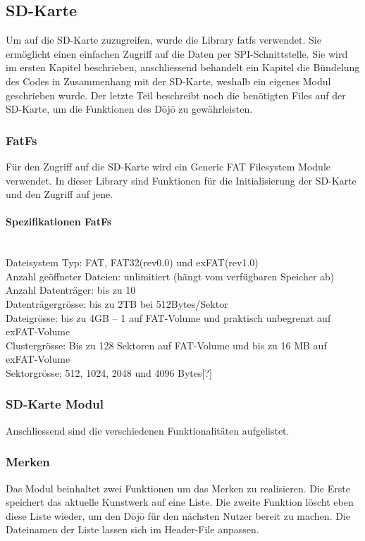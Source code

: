 \subsection{SD-Karte}\label{sec:sdKarte}
Um auf die SD-Karte zuzugreifen, wurde die Library fatfs verwendet. Sie ermöglicht einen einfachen Zugriff auf die Daten per SPI-Schnittstelle. Sie wird im ersten Kapitel beschrieben, anschliessend behandelt ein Kapitel die Bündelung des Codes in Zusammenhang mit der SD-Karte, weshalb ein eigenes Modul geschrieben wurde. Der letzte Teil beschreibt noch die benötigten Files auf der SD-Karte, um die Funktionen des Dōjō zu gewährleisten.

\subsubsection{FatFs}
Für den Zugriff auf die SD-Karte wird ein Generic FAT Filesystem Module verwendet. In dieser Library sind Funktionen für die Initialisierung der SD-Karte und den Zugriff auf jene. 

\paragraph{Spezifikationen FatFs}$~~$\\
Dateisystem Typ: FAT, FAT32(rev0.0) und exFAT(rev1.0)\\
Anzahl geöffneter Dateien: unlimitiert (hängt vom verfügbaren Speicher ab)\\
Anzahl Datenträger: bis zu 10\\
Datenträgergrösse: bis zu 2TB bei 512Bytes/Sektor\\
Dateigrösse: bis zu 4GB – 1 auf FAT-Volume und praktisch unbegrenzt auf exFAT-Volume\\
Clustergrösse: Bis zu 128 Sektoren auf FAT-Volume und bis zu 16 MB auf exFAT-Volume	\\
Sektorgrösse:  512, 1024, 2048 und 4096 Bytes[?]\\ 


\subsubsection{SD-Karte Modul}\label{sec:sdKarte modul}
Anschliessend sind die verschiedenen Funktionalitäten aufgelistet.

\subsubsection*{Merken}
Das Modul beinhaltet zwei Funktionen um das Merken zu realisieren. Die Erste speichert das aktuelle Kunstwerk auf eine Liste. Die zweite Funktion löscht eben diese Liste wieder, um den Dōjō für den nächsten Nutzer bereit zu machen. Die Dateinamen der Liste lassen sich im Header-File anpassen.

